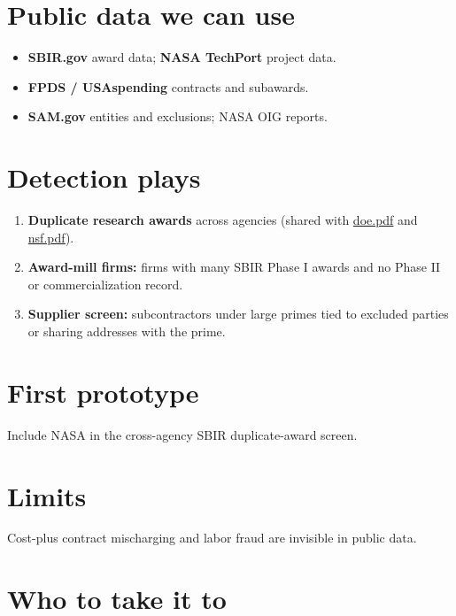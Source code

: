 \documentclass[letterpaper,11pt]{article}
\providecommand{\tightlist}{\setlength{\itemsep}{0pt}\setlength{\parskip}{0pt}}
\begin{document}
\hypertarget{public-data-we-can-use}{%
\section{Public data we can use}\label{public-data-we-can-use}}

\begin{itemize}
\tightlist
\item
  \textbf{SBIR.gov} award data; \textbf{NASA TechPort} project data.
\item
  \textbf{FPDS / USAspending} contracts and subawards.
\item
  \textbf{SAM.gov} entities and exclusions; NASA OIG reports.
\end{itemize}

\hypertarget{detection-plays}{%
\section{Detection plays}\label{detection-plays}}

\begin{enumerate}
\def\labelenumi{\arabic{enumi}.}
\tightlist
\item
  \textbf{Duplicate research awards} across agencies (shared with
  \url{doe.pdf} and \url{nsf.pdf}).
\item
  \textbf{Award-mill firms:} firms with many SBIR Phase I awards and no
  Phase II or commercialization record.
\item
  \textbf{Supplier screen:} subcontractors under large primes tied to
  excluded parties or sharing addresses with the prime.
\end{enumerate}

\hypertarget{first-prototype}{%
\section{First prototype}\label{first-prototype}}

Include NASA in the cross-agency SBIR duplicate-award screen.

\hypertarget{limits}{%
\section{Limits}\label{limits}}

Cost-plus contract mischarging and labor fraud are invisible in public
data.

\hypertarget{who-to-take-it-to}{%
\section{Who to take it to}\label{who-to-take-it-to}}
\end{document}
